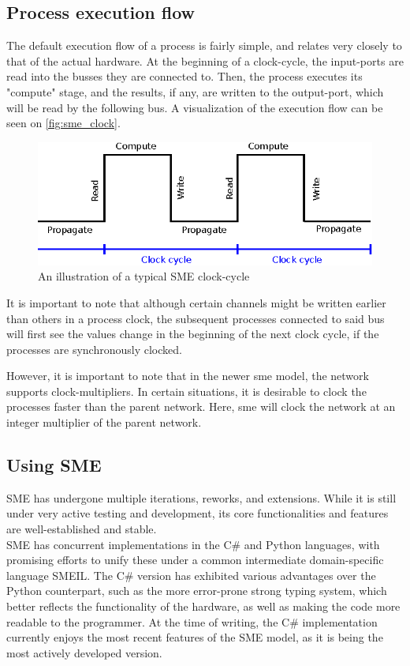 \subsection{Process execution flow}
The default execution flow of a process is
fairly simple, and relates very closely to that of the actual hardware. At
the beginning of a clock-cycle, the input-ports are read into the busses
they are connected to. Then, the process executes its "compute" stage, and
the results, if any, are written to the output-port, which will be read
by the following bus. A visualization of the execution flow can be seen
on \autoref{fig:sme_clock}.
\begin{figure}[h!]
\centering
\includegraphics[scale=0.5]{background/sme_clock.eps}
\caption{An illustration of a typical SME clock-cycle}
\label{fig:sme_clock}
\end{figure}

It is important to note that although certain channels might be written earlier
than others in a process clock, the subsequent processes connected to said bus
will first see the values change in the beginning of the next clock
cycle, if the processes are synchronously clocked.

However, it is important to note that in the newer \gls{sme} model, the network
supports clock-multipliers. In certain situations, it is desirable to clock the
processes faster than the parent network. Here, \gls{sme} will clock the
network at an integer multiplier of the parent network.

\subsection{Using SME}
SME has undergone multiple iterations, reworks, and extensions. While
it is still under very active testing and development, its core
functionalities and features
 are well-established and stable\cite{bus_centric_sme}.\\
SME has concurrent implementations in the C\# and Python languages,
with promising efforts to unify these under a common intermediate
domain-specific language SMEIL\cite{smeil}. The C\# version has
exhibited various advantages over the Python counterpart, such as
the more error-prone strong typing system, which better reflects the
functionality of the hardware, as well as making the code more readable to
the programmer. At the time of writing, the C\# implementation currently
enjoys the most recent features of the SME model, as it is being the
most actively developed version.


